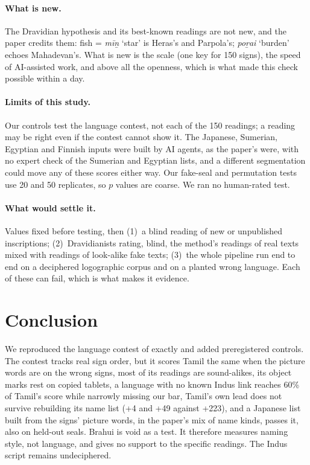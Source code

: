 \documentclass[11pt,a4paper]{article}
\newcommand{\tl}[1]{\emph{#1}}
\begin{document}
\paragraph{What is new.} The Dravidian hypothesis and its best-known readings are not new, and the paper credits them: fish = \tl{mīṉ} `star' is Heras's and Parpola's; \tl{poṟai} `burden' echoes Mahadevan's. What is new is the scale (one key for 150 signs), the speed of AI-assisted work, and above all the openness, which is what made this check possible within a day.

\paragraph{Limits of this study.} Our controls test the language contest, not each of the 150 readings; a reading may be right even if the contest cannot show it. The Japanese, Sumerian, Egyptian and Finnish inputs were built by AI agents, as the paper's were, with no expert check of the Sumerian and Egyptian lists, and a different segmentation could move any of these scores either way. Our fake-seal and permutation tests use 20 and 50 replicates, so $p$ values are coarse. We ran no human-rated test.

\paragraph{What would settle it.} Values fixed before testing, then (1)~a blind reading of new or unpublished inscriptions; (2)~Dravidianists rating, blind, the method's readings of real texts mixed with readings of look-alike fake texts; (3)~the whole pipeline run end to end on a deciphered logographic corpus and on a planted wrong language. Each of these can fail, which is what makes it evidence.

\section{Conclusion}

We reproduced the language contest of \citet{raj2026} exactly and added preregistered controls. The contest tracks real sign order, but it scores Tamil the same when the picture words are on the wrong signs, most of its readings are sound-alikes, its object marks rest on copied tablets, a language with no known Indus link reaches 60\% of Tamil's score while narrowly missing our bar, Tamil's own lead does not survive rebuilding its name list (+4 and +49 against +223), and a Japanese list built from the signs' picture words, in the paper's mix of name kinds, passes it, also on held-out seals. Brahui is void as a test. It therefore measures naming style, not language, and gives no support to the specific readings. The Indus script remains undeciphered.
\end{document}
